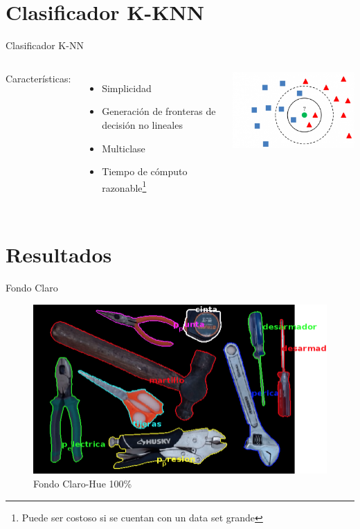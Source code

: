 \documentclass[
  24pt, %
]{beamer}
\begin{document}
\section{Clasificador K-KNN}
\begin{frame}{Clasificador K-NN}
  \begin{columns}
    Características:
    
    \begin{itemize}
      \pause
    \item Simplicidad
      \pause
    \item Generación de fronteras de decisión no lineales
      \pause
    \item Multiclase
      \pause
    \item Tiempo de cómputo razonable\footnote{Puede ser costoso si se cuentan con un data set grande}
    \end{itemize}
    \includegraphics[width=\textwidth]{knn}
    
  \end{columns}
\end{frame}

\section{Resultados}
\begin{frame}{Fondo Claro}
  \begin{figure}[h]
  \centering
  \includegraphics[width=\textwidth]{resultados_colores/resultado_claro_hue_1}
  \caption{Fondo Claro-Hue 100\%}
  \end{figure}
\end{frame}
\end{document}
